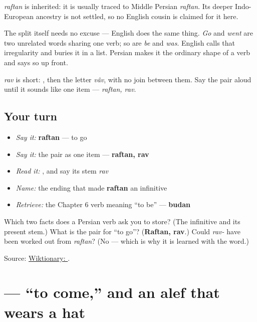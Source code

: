 \begin{cousinweb}
\textbf{} \emph{raftan} is inherited: it is usually traced to Middle Persian \emph{raftan}. Its deeper Indo-European ancestry is not settled, so no English cousin is claimed for it here.

The split itself needs no excuse — English does the same thing. \emph{Go} and \emph{went} are two unrelated words sharing one verb; so are \emph{be} and \emph{was}. English calls that irregularity and buries it in a list. Persian makes it the ordinary shape of a verb and says so up front.

\emph{rav} is short: \textbf{}, then the letter \emph{vâv}, with no join between them. Say the pair aloud until it sounds like one item — \emph{raftan, rav}.
\end{cousinweb}

\subsection*{Your turn}
\begin{itemize}
\raggedright
  \item \emph{Say it:} \textbf{raftan} — to go
  \item \emph{Say it:} the pair as one item — \textbf{raftan, rav}
  \item \emph{Read it:} \textbf{}, and say its stem \emph{rav}
  \item \emph{Name:} the ending that made \textbf{raftan} an infinitive
  \item \emph{Retrieve:} the Chapter 6 verb meaning “to be” — \textbf{budan}
\end{itemize}

\begin{tcolorbox}[breakable,colback=teal!4,colframe=teal!35!black,title={Before you move on}]
Which two facts does a Persian verb ask you to store? (The infinitive and its present stem.) What is the pair for “to go”? (\textbf{Raftan, rav}.) Could \emph{rav-} have been worked out from \emph{raftan}? (No — which is why it is learned with the word.)

Source: \href{https://en.wiktionary.org/wiki/\%D8\%B1\%D9\%81\%D8\%AA\%D9\%86}{Wiktionary: }.
\end{tcolorbox}
\section[\texorpdfstring{\fa{آمدن} (âmadan)}{آمدن (âmadan)}]{ — “to come,” and an alef that wears a hat}

